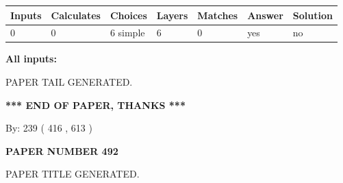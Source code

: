 \documentclass[12pt]{article}
\begin{document}
   
   
   
\noindent\begin{tabular}{|l|l|l|l|l|l|l|}
 \hline
Inputs & Calculates & Choices & Layers & Matches & Answer & Solution \\ \hline
 0  & 
 0  & 
 6
  simple  
  & 
 6  & 
 0  & 
  yes & 
  no 
  \\ \hline
 \end{tabular}
   
   
   
   
\noindent{}
   
   
   
   
\noindent\vspace{0.1in}\hspace{-0.08in} {\textbf{\Large{All inputs: }}}
   
   
   
   
   
   
 \vspace{0.2in}
 
   
   
\vspace{2.0in} PAPER TAIL GENERATED.
   
   
   
   
\vspace{1.0in} 
{\textbf{\large{ *** END OF PAPER, THANKS *** }}} 
   
   
\hspace{1.0in} By: 
 239 ( 416 ,  613 )
   
   
   
   
\newpage 
\setcounter{page}{ 
   492001 } 
   
   
   
   
 {\textbf{ \Large{ PAPER NUMBER  492  }}}
   
   
\vspace{0.2in}
   
   
   
   
   
   
   
   
 \vspace{0.2in}
 
 
 
 
   
   
 PAPER TITLE GENERATED.
   
   
   
\end{document}

